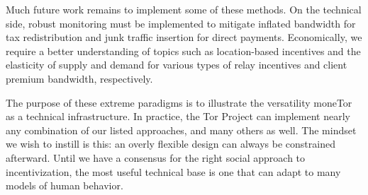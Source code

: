 Much future work remains to implement some of these methods.
On the technical side, robust monitoring must be implemented to mitigate inflated bandwidth for tax redistribution and junk traffic insertion for direct payments.
Economically, we require a better understanding of topics such as location-based incentives and the elasticity of supply and demand for various types of relay incentives and client premium bandwidth, respectively.

The purpose of these extreme paradigms is to illustrate the versatility moneTor as a technical infrastructure.
In practice, the Tor Project can implement nearly any combination of our listed approaches, and many others as well.
The mindset we wish to instill is this: an overly flexible design can always be constrained afterward.
Until we have a consensus for the right social approach to incentivization, the most useful technical base is one that can adapt to many models of human behavior.

